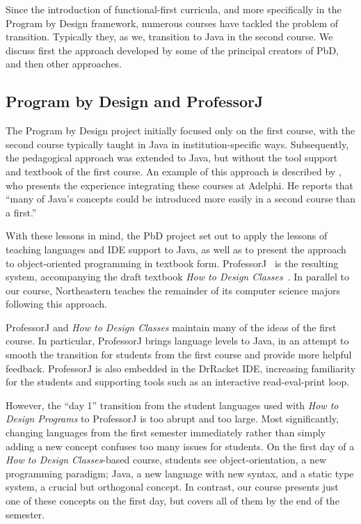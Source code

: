 \documentclass[submission,copyright]{eptcs}
\def\htdp{\emph{How to Design Programs}\xspace}
\def\htdc{\emph{How to Design Classes}\xspace}
\def\profj{{ProfessorJ}\xspace}
\begin{document}
Since the introduction of functional-first curricula, and more
specifically in the Program by Design framework, numerous courses have
tackled the problem of transition.  Typically they, as we, transition
to Java in the second course.  We discuss first the approach developed
by some of the principal creators of PbD, and then other approaches.

\subsection{Program by Design and ProfessorJ}

The Program by Design project initially focused only on the first course,
with the second course typically taught in Java in
institution-specific ways. Subsequently, the pedagogical approach was
extended to Java, but without the tool support and textbook of the
first course.  An example of this approach is described by
\citet{dvanhorn:Bloch2000Scheme}, who presents the experience
integrating these courses at Adelphi.  He reports that ``many of
Java's concepts could be introduced more easily in a second course
than a first.''

With these lessons in mind, the PbD project set out to apply
the lessons of teaching languages and IDE support to Java, as well as
to present the approach to object-oriented programming in textbook
form. ProfessorJ~\cite{dvanhorn:Gray2003ProfessorJ} is the resulting
system, accompanying the draft textbook \emph{How to Design
  Classes}~\cite{local:htdc}.  In parallel to our course, Northeastern
teaches the remainder of its computer science majors following this
approach.

ProfessorJ and \emph{How to Design Classes} maintain many of the ideas
of the first course.  In particular, ProfessorJ brings language levels
to Java, in an attempt to smooth the transition for students from the
first course and provide more helpful feedback.  ProfessorJ is also
embedded in the DrRacket IDE, increasing familiarity for the students
and supporting tools such as an interactive read-eval-print loop.


However, the ``day 1'' transition from the student languages used with
\htdp to \profj is too abrupt and too large.
%
Most significantly, changing languages from the first semester
immediately rather than simply adding a new concept confuses too many
issues for students.  On the first day of a \htdc-based course,
students see object-orientation, a new programming paradigm; Java, a
new language with new syntax, and a static type system, a crucial but
orthogonal concept.
%
In contrast, our course presents just one of these concepts on the
first day, but  covers all of them by the end of the semester.
\end{document}
